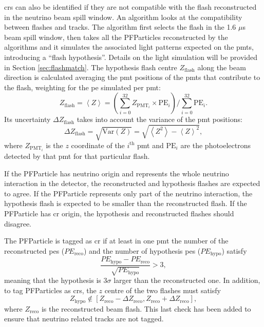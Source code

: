 \acrshort{cr}s can also be identified if they are not compatible with the flash reconstructed in the neutrino beam spill window. An algorithm looks at the compatibility between flashes and tracks. The algorithm first selects the flash in the 1.6 $\mu$s beam spill window, then takes all the PFParticles reconstructed by the \pc algorithms and it simulates the associated light patterns expected on the \acrshort{pmt}s, introducing a ``flash hypothesis''. Details on the light simulation will be provided in  Section \ref{sec:flashmatch}.
The hypothesis flash centre $Z_\text{flash}$ along the beam direction is calculated averaging the \acrshort{pmt} positions of the \acrshort{pmt}s that contribute to the flash, weighting for the \acrshort{pe} simulated per \acrshort{pmt}:
\begin{equation}
\label{eq:flash_z}
Z_\text{flash} = \left<Z\right> = \left ( \sum_{i=0}^{32} Z_{\text{PMT}_i} \times \text{PE}_i \right ) / \sum_{i=0}^{32} \text{PE}_i.
\end{equation}
Its uncertainty $\Delta Z_\text{flash}$ takes into account the variance of the \acrshort{pmt} positions:
\begin{equation}
\Delta Z_\text{flash} = \sqrt{ \text{Var}(Z) } = \sqrt{ \left<Z^2\right> - \left<Z\right>^2 },
\end{equation}
where $Z_{\text{PMT}_i}$ is the $z$ coordinate of the $i^\text{th}$ \acrshort{pmt} and $\text{PE}_i$ are the photoelectrons detected by that \acrshort{pmt} for that particular flash.


If the PFParticle has neutrino origin and represents the whole neutrino interaction in the detector, the reconstructed and hypothesis flashes are expected to agree. If the PFParticle represents only part of the neutrino interaction, the hypothesis flash is expected to be smaller than the reconstructed flash. If the PFParticle has \acrshort{cr} origin, the hypothesis and reconstructed flashes should disagree.

The PFParticle is tagged as \acrshort{cr} if at least in one \acrshort{pmt} the number of the reconstructed \acrshort{pe}s ($PE_\text{reco}$) and the number of hypothesis \acrshort{pe}s ($PE_\text{hypo}$) satisfy
\begin{equation}
\frac{PE_\text{hypo} - PE_\text{reco}}{\sqrt{PE_\text{hypo}}} > 3,
\end{equation}
meaning that the hypothesis is 3$\sigma$ larger than the reconstructed one. In addition, to tag PFParticles as \acrshort{cr}s, the $z$ centre of the two flashes must satisfy
\begin{equation}
Z_\text{hypo} \notin \left [ Z_\text{reco}-\Delta Z_\text{reco}, Z_\text{reco}+\Delta Z_\text{reco}  \right ],
\end{equation}
where $Z_\text{reco}$ is the reconstructed beam flash. This last check has been added to ensure that neutrino related tracks are not tagged.










